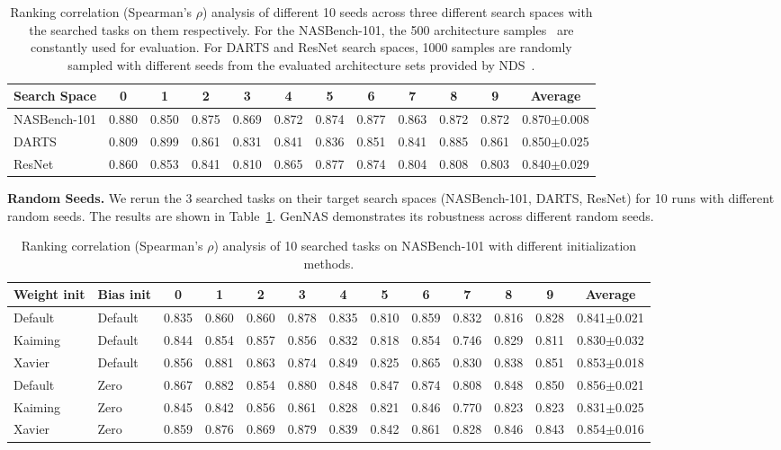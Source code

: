 \documentclass{article}
\begin{document}
\begin{table}[h]
  \caption{Ranking correlation (Spearman's $\rho$) analysis of different 10 seeds across three different search spaces with the searched tasks on them respectively. For the NASBench-101, the 500 architecture samples~\cite{liu2020labels} are constantly used for evaluation. For DARTS and ResNet search spaces, 1000 samples are randomly sampled with different seeds from the evaluated architecture sets provided by NDS~\cite{radosavovic2019network}.}\label{table:seed}
  \centering
  \scriptsize
\begin{tabular}{lccccccccccc}
\toprule
Search Space & 0 & 1 & 2 & 3 & 4 & 5 & 6 & 7 & 8 & 9 & Average\\\midrule
 NASBench-101& 0.880 &0.850 & 0.875 & 0.869 & 0.872 & 0.874 & 0.877 & 0.863 & 0.872 & 0.872 & 0.870$\pm$0.008\\
 DARTS  & 0.809 & 0.899 & 0.861 & 0.831 & 0.841 & 0.836 & 0.851 & 0.841 & 0.885 & 0.861& 0.850$\pm$0.025\\
 ResNet&  0.860 & 0.853 & 0.841 & 0.810 & 0.865 & 0.877 & 0.874 & 0.804 & 0.808 & 0.803 & 0.840$\pm$0.029\\\bottomrule
\end{tabular}
\end{table}

\textbf{Random Seeds.}
We rerun the 3 searched tasks on their target search spaces (NASBench-101, DARTS, ResNet) for 10 runs with different random seeds. The results are shown in Table~\ref{table:seed}. GenNAS demonstrates its robustness across different random seeds.

\begin{table}[b]
  \caption{Ranking correlation (Spearman's $\rho$) analysis of 10 searched tasks on NASBench-101 with different initialization methods.}\label{table:initialization}
  \centering
  \tiny
\begin{tabular}{llccccccccccc}
\toprule
Weight init&Bias init& 0 & 1 & 2 & 3 & 4 & 5 & 6 & 7 & 8 & 9 & Average\\\midrule
 Default& Default& 0.835 &0.860 & 0.860 & 0.878 & 0.835 & 0.810 & 0.859 & 0.832 & 0.816 & 0.828 & 0.841$\pm$0.021\\
 Kaiming  & Default&0.844 & 0.854 & 0.857 & 0.856 & 0.832 & 0.818 & 0.854 & 0.746 & 0.829 & 0.811& 0.830$\pm$0.032\\
 Xavier&  Default&0.856 & 0.881 & 0.863 & 0.874 & 0.849 & 0.825 & 0.865 & 0.830 & 0.838 & 0.851 & 0.853$\pm$0.018\\
 Default& Zero&0.867 &0.882 & 0.854 & 0.880 & 0.848 & 0.847 & 0.874 & 0.808 & 0.848 & 0.850 & 0.856$\pm$0.021\\
 Kaiming  & Zero&0.845 & 0.842 & 0.856 & 0.861 & 0.828 & 0.821 & 0.846 & 0.770 & 0.823 & 0.823& 0.831$\pm$0.025\\
 Xavier&  Zero&0.859 & 0.876 & 0.869 & 0.879 & 0.839 & 0.842 & 0.861 & 0.828 & 0.846 & 0.843& 0.854$\pm$0.016\\
 \bottomrule
\end{tabular}
\end{table}
\end{document}

